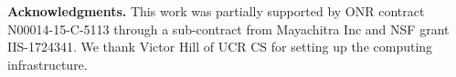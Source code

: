 \documentclass[runningheads]{llncs}
\begin{document}
\noindent
\textbf{Acknowledgments.} This work was partially supported by ONR contract N00014-15-C-5113 through a sub-contract from Mayachitra Inc and NSF grant IIS-1724341. We thank Victor Hill of UCR CS for setting up the computing infrastructure.




\end{document}
